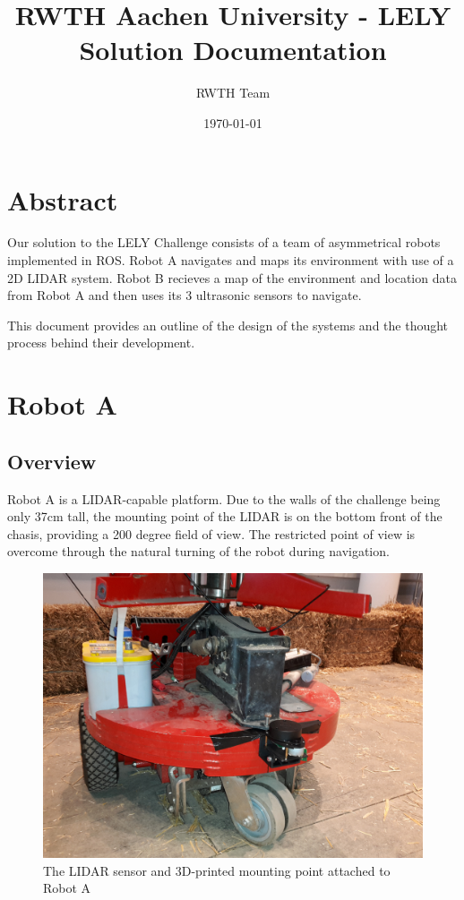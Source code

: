 \documentclass[11pt]{article}
\title{RWTH Aachen University - LELY Solution Documentation}
\author{RWTH Team}
\date{\today}
\begin{document}
	\maketitle	
	
	\section{Abstract}
	
	Our solution to the LELY Challenge consists of a team of asymmetrical robots implemented in ROS. Robot A navigates and maps its environment with use of a 2D LIDAR system. Robot B recieves a map of the environment and location data from Robot A and then uses its 3 ultrasonic sensors to navigate. \newline
	
	This document provides an outline of the design of the systems and the thought process behind their development.	
	
	\section{Robot A}
	
	\subsection{Overview}
	Robot A is a LIDAR-capable platform. Due to the walls of the challenge being only 37cm tall, the mounting point of the LIDAR is on the bottom front of the chasis, providing a 200 degree field of view. The restricted point of view is overcome through the natural turning of the robot during navigation.
	
	\begin{figure}[h]
		\centering
		\includegraphics[scale=0.1]{robot_a}
		\caption{The LIDAR sensor and 3D-printed mounting point attached to Robot A}
	\end{figure}
	
\end{document}

